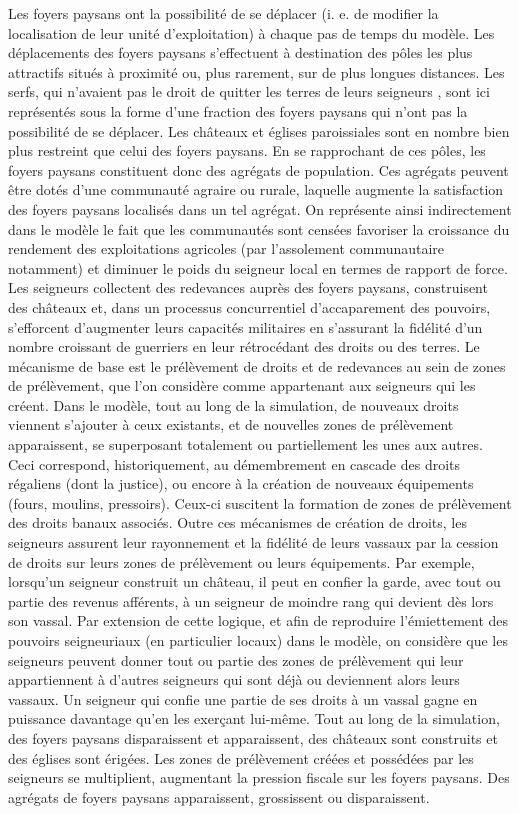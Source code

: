 \documentclass[12pt, a4paper, oneside]{book}
\begin{document}
	Les foyers paysans ont la possibilité de se déplacer (i. e. de modifier la
	localisation de leur unité d'exploitation) à chaque pas de temps du modèle.
	Les déplacements des foyers paysans s'effectuent à destination des pôles les plus attractifs situés à proximité ou, plus rarement, sur de plus longues distances.
	Les serfs, qui n'avaient pas le droit de quitter les terres de leurs seigneurs \autocite{feller_paysans_2007}, sont ici représentés sous la forme d'une fraction des foyers paysans qui n'ont pas la possibilité de se déplacer.
	Les châteaux et églises paroissiales sont en nombre bien plus restreint	que celui des foyers paysans.
	En se rapprochant de ces pôles, les foyers paysans constituent donc des agrégats de population.
	Ces agrégats peuvent être dotés d'une communauté agraire ou rurale, laquelle augmente la satisfaction des foyers paysans localisés dans un tel agrégat.
	On représente ainsi indirectement dans le modèle le fait que les communautés sont censées favoriser la croissance du rendement des exploitations agricoles (par l'assolement communautaire notamment) et diminuer le poids du seigneur local en termes de rapport de force.
	Les seigneurs collectent des redevances auprès des foyers paysans, construisent des châteaux et, dans un processus concurrentiel d'accaparement des pouvoirs, s'efforcent d'augmenter leurs capacités militaires en s'assurant la fidélité d'un nombre croissant de guerriers en leur rétrocédant des droits ou des terres.
	Le mécanisme de base est le prélèvement de droits et de redevances au sein de zones de prélèvement, que l'on considère comme appartenant aux seigneurs qui les créent.
	Dans le modèle, tout au long de la simulation, de nouveaux droits viennent s'ajouter à ceux existants, et de nouvelles zones de prélèvement apparaissent, se superposant totalement ou partiellement les unes aux
	autres.
	Ceci correspond, historiquement, au démembrement en cascade des droits régaliens (dont la justice), ou encore à la création de nouveaux équipements (fours, moulins, pressoirs).
	Ceux-ci suscitent la formation de zones de prélèvement des droits banaux associés.
	Outre ces mécanismes de création de droits, les seigneurs assurent leur rayonnement et la fidélité de leurs vassaux par la cession de droits sur leurs zones de prélèvement ou leurs équipements.
	Par exemple, lorsqu'un seigneur construit un château, il peut en confier la garde, avec tout ou partie des revenus afférents, à un seigneur de moindre rang qui devient dès lors son vassal.
	Par extension de cette logique, et afin de reproduire l'émiettement des pouvoirs seigneuriaux (en particulier locaux) dans le modèle, on considère que les seigneurs peuvent donner tout ou partie des zones de prélèvement qui leur appartiennent à d'autres seigneurs qui sont déjà ou deviennent alors leurs vassaux.
	Un seigneur qui confie une partie de ses droits à un vassal gagne en puissance davantage qu'en les exerçant lui-même.
	Tout au long de la simulation, des foyers paysans disparaissent et apparaissent, des châteaux sont construits et des églises sont érigées.
	Les zones de prélèvement créées et possédées par les seigneurs se multiplient, augmentant la pression fiscale sur les foyers paysans.
	Des agrégats de foyers paysans apparaissent, grossissent ou disparaissent.
	
\end{document}
